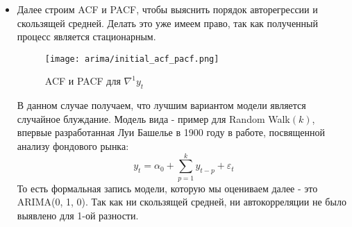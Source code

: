 \begin{itemize}
		\item Далее строим ACF и PACF, чтобы выяснить порядок авторегрессии и скользящей средней. Делать это уже имеем право, так как полученный процесс является стационарным.
		\begin{figure}[H]
			\centering
			\texttt{[image: arima/initial\_acf\_pacf.png]}
			\caption{ACF и PACF для $\nabla^1y_t$}
		\end{figure}
		В данном случае получаем, что лучшим вариантом модели является случайное блуждание. Модель вида  - пример для Random Walk$(k)$, впервые разработанная Луи Башелье \cite{fama_market_efficiency} в 1900 году в работе, посвященной анализу фондового рынка:
		\begin{equation}
			y_t = \alpha_0 + \sum_{p = 1}^k y_{t - p} + \varepsilon_{t}
		\end{equation}
		То есть формальная запись модели, которую мы оцениваем далее - это ARIMA(0, 1, 0). Так как ни скользящей средней, ни автокорреляции не было выявлено для 1-ой разности.
		

\end{itemize}
